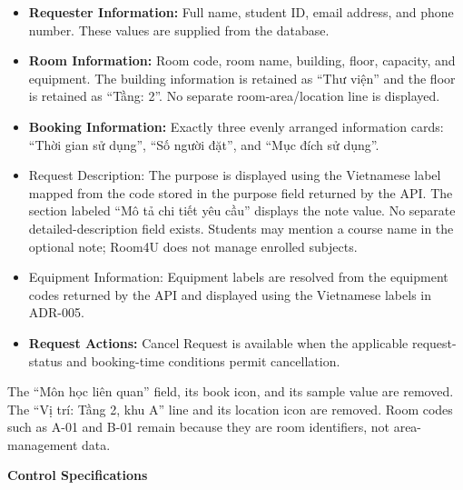 \begin{itemize}
\item
  \textbf{Requester Information:} Full name, student ID, email address,
  and phone number. These values are supplied from the database.
\item
  \textbf{Room Information:} Room code, room name, building, floor,
  capacity, and equipment. The building information is retained as
  ``Thư viện'' and the floor is retained
  as ``Tầng: 2''. No separate
  room-area/location line is displayed.
\item
  \textbf{Booking Information:} Exactly three evenly arranged
  information cards: ``Thời gian sử dụng'',
  ``Số người đặt'', and
  ``Mục đích sử dụng''.
\item
  Request Description: The purpose is displayed using the Vietnamese
  label mapped from the code stored in the purpose field returned by the
  API. The section labeled ``Mô tả chi tiết yêu
  cầu'' displays the note value. No separate
  detailed-description field exists. Students may mention a course name
  in the optional note; Room4U does not manage enrolled subjects.
\item
  Equipment Information: Equipment labels are resolved from the
  equipment codes returned by the API and displayed using the Vietnamese
  labels in ADR-005.
\item
  \textbf{Request Actions:} Cancel Request is available when the
  applicable request-status and booking-time conditions permit
  cancellation.
\end{itemize}

The ``Môn học liên quan'' field, its book
icon, and its sample value are removed. The ``Vị trí:
Tầng 2, khu A'' line and its location icon are removed.
Room codes such as A-01 and B-01 remain because they are room
identifiers, not area-management data.

\textbf{Control Specifications}

